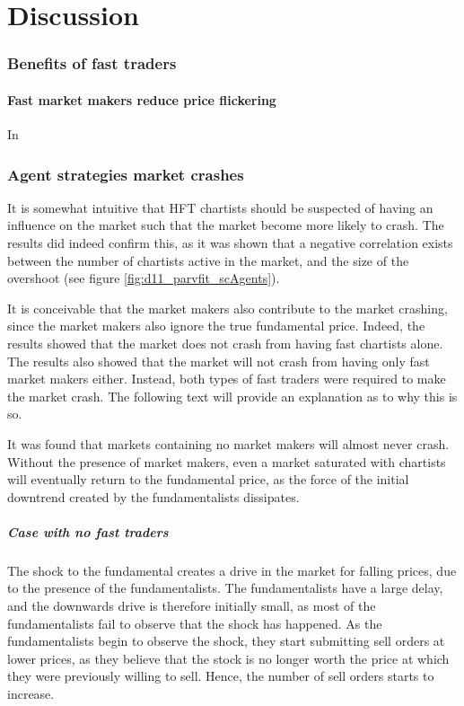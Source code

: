 \part{Discussion}\label{chapter:discussion}

\section{Benefits of fast traders}

\subsection{Fast market makers reduce price flickering}
In 


\section{Agent strategies market crashes}


It is somewhat intuitive that HFT chartists should be suspected of having an influence on the market such that the market become more likely to crash. The results did indeed confirm this, as it was shown that a negative correlation exists between the number of chartists active in the market, and the size of the overshoot (see figure \ref{fig:d11_parvfit_scAgents}). 

It is conceivable that the market makers also contribute to the market crashing, since the market makers also ignore the true fundamental price. Indeed, the results showed that the market does not crash from having fast chartists alone. The results also showed that the market will not crash from having only fast market makers either. Instead, both types of fast traders were required to make the market crash. The following text will provide an explanation as to why this is so.

It was found that markets containing no market makers will almost never crash. Without the presence of market makers, even a market saturated with chartists will eventually return to the fundamental price, as the force of the initial downtrend created by the fundamentalists dissipates. 


\subsubsection*{Case with no fast traders}
The shock to the fundamental creates a drive in the market for falling prices, due to the presence of the fundamentalists. The fundamentalists have a large delay, and the downwards drive is therefore initially small, as most of the fundamentalists fail to observe that the shock has happened. As the fundamentalists begin to observe the shock, they start submitting sell orders at lower prices, as they believe that the stock is no longer worth the price at which they were previously willing to sell. Hence, the number of sell orders starts to increase. 


